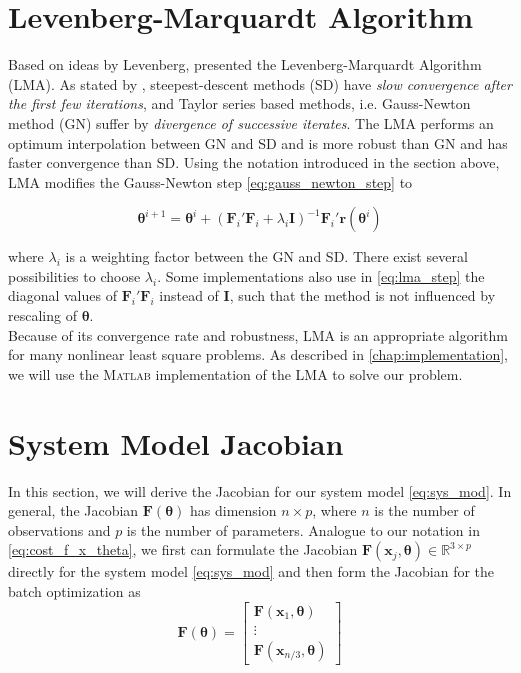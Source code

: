 \section{Levenberg-Marquardt Algorithm}
Based on ideas by Levenberg, \citet{Marquardt1963} presented the Levenberg-Marquardt Algorithm (LMA).
As stated by \citeauthor{Marquardt1963},
steepest-descent methods (SD) have \textit{slow convergence after the first few iterations},
and Taylor series based methods, i.e. Gauss-Newton method (GN) suffer by \textit{divergence of successive iterates}.
The LMA performs an optimum interpolation between GN and SD
and is more robust than GN and has faster convergence than SD.
Using the notation introduced in the section above, LMA modifies the Gauss-Newton step \cref{eq:gauss_newton_step} to

\begin{equation}
\label{eq:lma_step}
\boldsymbol{\theta}^{i+1} =
\boldsymbol{\theta}^{i} + 
(\mathbf{F}_i' \mathbf{F}_i + \lambda_i \mathbf{I})^{-1} \mathbf{F}_i' \mathbf{r}(\boldsymbol{\theta}^{i})
\end{equation}

where $\lambda_i$ is a weighting factor between the GN and SD.
There exist several possibilities to choose $\lambda_i$.
Some implementations also use in \cref{eq:lma_step} the diagonal values of $\mathbf{F}_i' \mathbf{F}_i$ instead of $\mathbf{I}$, such that the method is not influenced by rescaling of $\boldsymbol{\theta}$.
\\

Because of its convergence rate and robustness, LMA is an appropriate algorithm for many nonlinear least square problems.
As described in \cref{chap:implementation}, we will use the \textsc{Matlab} implementation of the LMA to solve our problem.

\section{System Model Jacobian}
In this section, we will derive the Jacobian for our system model \cref{eq:sys_mod}.
In general, the Jacobian $\mathbf{F}(\boldsymbol{\theta})$ has dimension $n \times p$, where $n$ is the number of observations and $p$ is the number of parameters.
Analogue to our notation in \cref{eq:cost_f_x_theta}, we first can formulate the Jacobian $\mathbf{F}(\mathbf{x}_j, \boldsymbol{\theta}) \in \mathbb{R}^{3\times p}$ directly for the system model \cref{eq:sys_mod} and then form the Jacobian for the batch optimization as
\begin{equation}
\mathbf{F}(\boldsymbol{\theta}) = \left[ \begin{array}{c}
\mathbf{F}(\mathbf{x}_1, \boldsymbol{\theta}) \\
\vdots \\
\mathbf{F}(\mathbf{x}_{n/3}, \boldsymbol{\theta})
\end{array} \right]
\end{equation}

